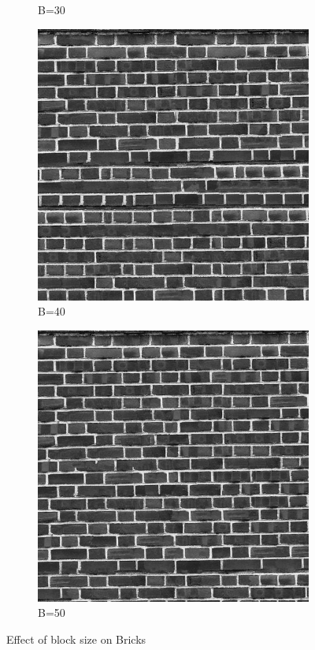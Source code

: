 \documentclass[10pt,twocolumn,letterpaper]{article}
\begin{document}
\begin{figure}[h]
\begin{subfigure}[h]{0.2\textwidth}
       \caption{B=30}
   \end{subfigure}
   \hfill
   \begin{subfigure}[h]{0.2\textwidth}
       \centering
       \includegraphics[scale=0.15]{../results/syn/out_brick_bw_B_40.png}
       \caption{B=40}
   \end{subfigure}
   \begin{subfigure}[h]{0.2\textwidth}
       \centering
       \includegraphics[scale=0.15]{../results/syn/out_brick_bw_B_50.png}
       \caption{B=50}
   \end{subfigure}
   \caption{Effect of block size on Bricks}
   \label{fig:cans_bs}
\end{figure}
\end{document}
